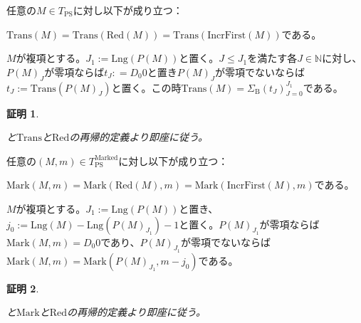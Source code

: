 \documentclass[dvipdfmx,uplatex]{jsarticle}
\theoremstyle{customnonumberbreakfortheorem}
\theoremstyle{customnonumberbreakforproof}
\newtheorem{hideableproof}{証明}
\begin{document}
\begin{proposition}\label{Transの(IncrFirst,Red)不変P同変性}
	任意の\(M \in T_{\textrm{PS}}\)に対し以下が成り立つ：
	\begin{penumerate}
		\item \(\textrm{Trans}(M) = \textrm{Trans}(\textrm{Red}(M)) = \textrm{Trans}(\textrm{IncrFirst}(M))\)である。
		\item \(M\)が複項とする。\(J_1 := \textrm{Lng}(P(M))\)と置く。\(J \leq J_1\)を満たす各\(J \in \mathbb{N}\)に対し、\(P(M)_J\)が零項ならば\(t_J : = D_0 0\)と置き\(P(M)_J\)が零項でないならば\(t_J := \textrm{Trans}(P(M)_J)\)と置く。この時\(\textrm{Trans}(M) = \Sigma_{\textrm{B}} (t_J)_{J=0}^{J_1}\)である。
	\end{penumerate}
\end{proposition}

\begin{hideableproof}
	\begin{indented}
		\item {}と\(\textrm{Trans}\)と\(\textrm{Red}\)の再帰的定義より即座に従う。
	\end{indented}
\end{hideableproof}

\begin{proposition}\label{Markの(IncrFirst,Red,P)不変性}
	任意の\((M,m) \in T_{\textrm{PS}}^{\textrm{Marked}}\)に対し以下が成り立つ：
	\begin{penumerate}
		\item \(\textrm{Mark}(M,m) = \textrm{Mark}(\textrm{Red}(M),m) = \textrm{Mark}(\textrm{IncrFirst}(M),m)\)である。
		\item \(M\)が複項とする。\(J_1 := \textrm{Lng}(P(M))\)と置き、\(j_0 := \textrm{Lng}(M) - \textrm{Lng}(P(M)_{J_1}) - 1\)と置く。\(P(M)_{J_1}\)が零項ならば\(\textrm{Mark}(M,m) = D_0 0\)であり、\(P(M)_{J_1}\)が零項でないならば\(\textrm{Mark}(M,m) = \textrm{Mark}(P(M)_{J_1},m-j_0)\)である。
	\end{penumerate}
\end{proposition}

\begin{hideableproof}
	\begin{indented}
		\item {}と\(\textrm{Mark}\)と\(\textrm{Red}\)の再帰的定義より即座に従う。
	\end{indented}
\end{hideableproof}
\end{document}

